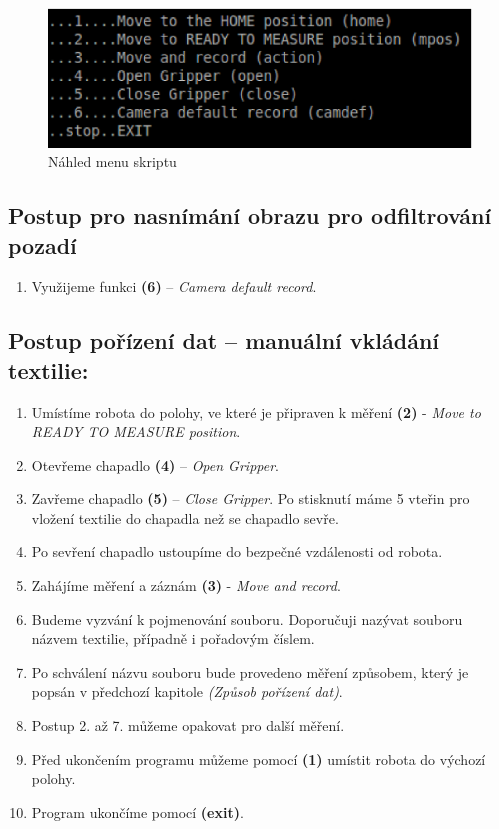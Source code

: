 \documentclass[10pt,a4paper,titlepage,oneside]{report}
\begin{document}
\begin{figure}[H]
	\centering  	
  	\includegraphics[scale=0.6]{pictures/obrazek3.eps}
  	\caption{Náhled menu skriptu}
  	\label{fig:menu}
\end{figure}

\subsection{Postup pro nasnímání obrazu pro odfiltrování pozadí}
\begin{enumerate}
  \item Využijeme funkci \textbf{(6)} – \textit{Camera default record}.
\end{enumerate}

\subsection{Postup pořízení dat – manuální vkládání textilie:}
\begin{enumerate}
  \item Umístíme robota do polohy, ve které je připraven k měření \textbf{(2)} - \textit{Move to READY TO MEASURE position}.
  \item Otevřeme chapadlo \textbf{(4)} – \textit{Open Gripper}.
  \item Zavřeme chapadlo \textbf{(5)} – \textit{Close Gripper}. Po stisknutí máme 5 vteřin pro vložení textilie do chapadla než se chapadlo sevře.
  \item Po sevření chapadlo ustoupíme do bezpečné vzdálenosti od robota.
  \item Zahájíme měření a záznám \textbf{(3)} - \textit{Move and record}.
  \item Budeme vyzvání k pojmenování souboru. Doporučuji nazývat souboru názvem textilie, případně i pořadovým číslem.
  \item Po schválení názvu souboru bude provedeno měření způsobem, který je popsán v předchozí kapitole \textit{(Způsob pořízení dat)}.
  \item Postup 2. až 7. můžeme opakovat pro další měření.
  \item Před ukončením programu můžeme pomocí \textbf{(1)} umístit robota do výchozí polohy.
  \item Program ukončíme pomocí \textbf{(exit)}.
\end{enumerate}
\end{document}
